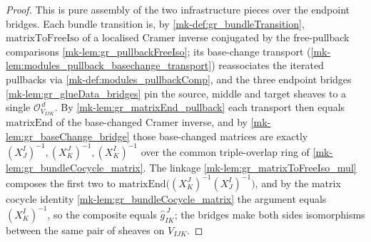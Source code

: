 \begin{proof}
  This is pure assembly of the two infrastructure pieces over the endpoint bridges. Each
  bundle transition is, by \ref{mk-def:gr_bundleTransition}, \(\mathrm{matrixToFreeIso}\) of a
  localised Cramer inverse conjugated by the free-pullback comparisons
  \ref{mk-lem:gr_pullbackFreeIso}; its base-change transport
  (\ref{mk-lem:modules_pullback_basechange_transport}) reassociates the iterated pullbacks via
  \ref{mk-def:modules_pullbackComp}, and the three endpoint bridges \ref{mk-lem:gr_glueData_bridges}
  pin the source, middle and target sheaves to a single \(\mathcal{O}_{V_{IJK}}^{\,d}\). By
  \ref{mk-lem:gr_matrixEnd_pullback} each transport then equals \(\mathrm{matrixEnd}\) of the
  base-changed Cramer inverse, and by \ref{mk-lem:gr_baseChange_bridge} those base-changed matrices
  are exactly \((X^I_J)^{-1}, (X^J_K)^{-1}, (X^I_K)^{-1}\) over the common triple-overlap ring of
  \ref{mk-lem:gr_bundleCocycle_matrix}. The linkage \ref{mk-lem:gr_matrixToFreeIso_mul} composes the
  first two to \(\mathrm{matrixEnd}\bigl((X^J_K)^{-1}(X^I_J)^{-1}\bigr)\), and
  by the matrix cocycle identity \ref{mk-lem:gr_bundleCocycle_matrix} the argument equals
  \((X^I_K)^{-1}\), so the composite equals \(\widehat{g}_{IK}^{\,J}\); the bridges make both
  sides isomorphisms between the same pair of sheaves on \(V_{IJK}\).
\end{proof}


